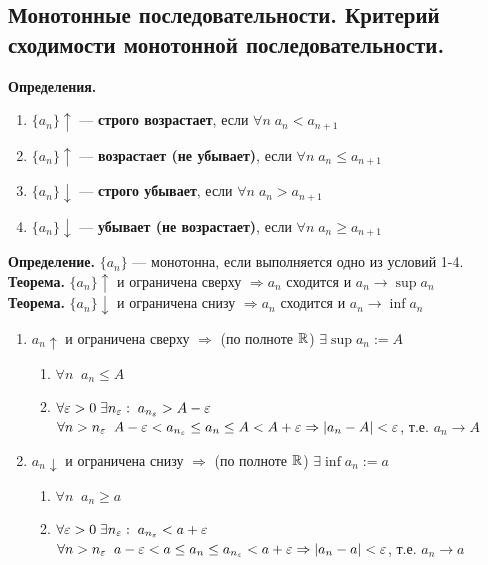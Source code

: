 \subsection{Монотонные последовательности. Критерий сходимости монотонной последовательности.}

\textbf{Определения.}
\begin{enumerate}
	\item $\{a_n\} \uparrow$ — \textbf{строго возрастает}, если $\forall n\; a_n < a_{n + 1}$
	\item $\{a_n\} \uparrow$ — \textbf{возрастает (не убывает)}, если $\forall n\; a_n \leq a_{n + 1}$
	\item $\{a_n\}\downarrow$ — \textbf{строго убывает}, если $\forall n\; a_n > a_{n + 1}$ %
	\item $\{a_n\}\downarrow$ — \textbf{убывает (не возрастает)}, если $\forall n\; a_n \geq a_{n + 1}$
\end{enumerate}
\textbf{Определение.} $\{a_n\}$ — монотонна, если выполняется одно из условий 1-4.\\

\textbf{Теорема.} $\{a_n\} \uparrow$ и ограничена сверху $\Rightarrow a_n$ сходится и $a_n \to \sup a_n$\\
\textbf{Теорема.} $\{a_n\} \downarrow$ и ограничена снизу $\Rightarrow a_n$ сходится и $a_n \to \inf a_n$

\begin{tcolorbox}[title=Доказательство (случай конечного предела)]
	\begin{enumerate}
		\item $a_n \uparrow$ и ограничена сверху $\Rightarrow$ (по полноте $\mathbb{R}$) $\exists \sup a_n := A$
    \begin{enumerate}
        \item $\forall n\;\; a_n \leq A$
        \item $\forall \varepsilon > 0\; \exists n_\varepsilon:\; a_{n_\varepsilon} > A - \varepsilon$\\
            $\forall n > n_\varepsilon\;\; A - \varepsilon < a_{n_\varepsilon} \leq a_n \leq A < A + \varepsilon \Rightarrow |a_n - A| < \varepsilon$, т.е. $a_n \to A$
    \end{enumerate}
		\item $a_n \downarrow$ и ограничена снизу $\Rightarrow$ (по полноте $\mathbb{R}$) $\exists \inf a_n := a$ %
			\begin{enumerate}
				\item $\forall n\;\; a_n \geq a$
				\item $\forall \varepsilon > 0\; \exists n_\varepsilon:\; a_{n_\varepsilon} < a + \varepsilon$\\
					$\forall n > n_\varepsilon\;\; a-\varepsilon < a \leq a_n \leq a_{n_\varepsilon} < a + \varepsilon \Rightarrow |a_n - a| < \varepsilon$, т.е. $a_n \to a$
			\end{enumerate}
	\end{enumerate}
\end{tcolorbox}

